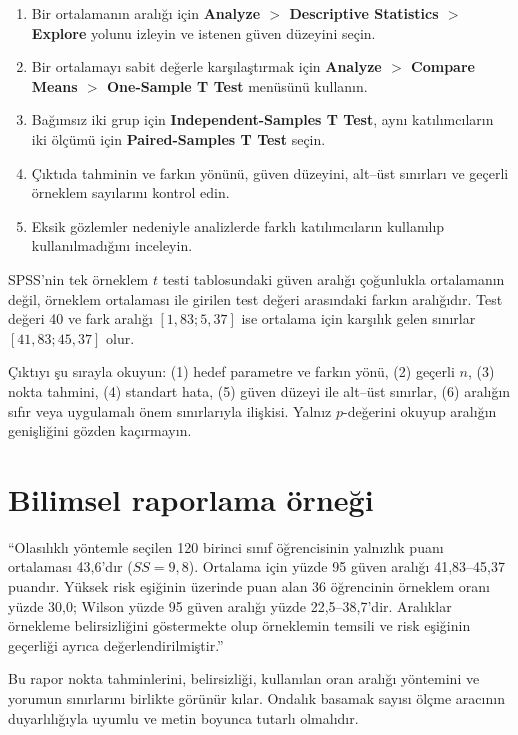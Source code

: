 \begin{enumerate}
  \item Bir ortalamanın aralığı için \textbf{Analyze $>$ Descriptive Statistics $>$ Explore} yolunu izleyin ve istenen güven düzeyini seçin.
  \item Bir ortalamayı sabit değerle karşılaştırmak için \textbf{Analyze $>$ Compare Means $>$ One-Sample T Test} menüsünü kullanın.
  \item Bağımsız iki grup için \textbf{Independent-Samples T Test}, aynı katılımcıların iki ölçümü için \textbf{Paired-Samples T Test} seçin.
  \item Çıktıda tahminin ve farkın yönünü, güven düzeyini, alt--üst sınırları ve geçerli örneklem sayılarını kontrol edin.
  \item Eksik gözlemler nedeniyle analizlerde farklı katılımcıların kullanılıp kullanılmadığını inceleyin.
\end{enumerate}

SPSS'nin tek örneklem $t$ testi tablosundaki güven aralığı çoğunlukla
ortalamanın değil, örneklem ortalaması ile girilen test değeri arasındaki
farkın aralığıdır. Test değeri 40 ve fark aralığı $[1{,}83;5{,}37]$ ise
ortalama için karşılık gelen sınırlar $[41{,}83;45{,}37]$ olur.

\begin{outputguidebox}
Çıktıyı şu sırayla okuyun: (1) hedef parametre ve farkın yönü, (2) geçerli
$n$, (3) nokta tahmini, (4) standart hata, (5) güven düzeyi ile alt--üst
sınırlar, (6) aralığın sıfır veya uygulamalı önem sınırlarıyla ilişkisi.
Yalnız $p$-değerini okuyup aralığın genişliğini gözden kaçırmayın.
\end{outputguidebox}

\section{Bilimsel raporlama örneği}

``Olasılıklı yöntemle seçilen 120 birinci sınıf öğrencisinin yalnızlık puanı
ortalaması 43,6'dır ($SS=9{,}8$). Ortalama için yüzde 95 güven aralığı
41,83--45,37 puandır. Yüksek risk eşiğinin üzerinde puan alan 36 öğrencinin
örneklem oranı yüzde 30,0; Wilson yüzde 95 güven aralığı yüzde 22,5--38,7'dir.
Aralıklar örnekleme belirsizliğini göstermekte olup örneklemin temsili ve risk
eşiğinin geçerliği ayrıca değerlendirilmiştir.''

Bu rapor nokta tahminlerini, belirsizliği, kullanılan oran aralığı yöntemini
ve yorumun sınırlarını birlikte görünür kılar. Ondalık basamak sayısı ölçme
aracının duyarlılığıyla uyumlu ve metin boyunca tutarlı olmalıdır.

